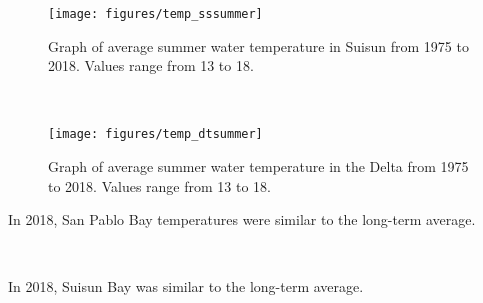 \documentclass[
]{book}
\begin{document}
\begin{panel-grid}
\begin{columns-nocenter}
\begin{column800}

\begin{expand}

\begin{figure}
\texttt{[image: figures/temp\_sssummer]} \caption{Graph of average summer water temperature in Suisun from 1975 to 2018. Values range from 13 to 18.}\label{fig:unnamed-chunk-58}
\end{figure}

\end{expand}

\end{column800}

\begin{column40}

~

\end{column40}

\begin{column800}

\begin{expand}

\begin{figure}
\texttt{[image: figures/temp\_dtsummer]} \caption{Graph of average summer water temperature in the Delta from 1975 to 2018. Values range from 13 to 18.}\label{fig:unnamed-chunk-59}
\end{figure}

\end{expand}

\end{column800}

\end{columns-nocenter}

\begin{columns-nocenter}

\begin{column800}

In 2018, San Pablo Bay temperatures were similar to the long-term average.

\end{column800}

\begin{column40}

~

\end{column40}

\begin{column800}

In 2018, Suisun Bay was similar to the long-term average.


\end{column800}
\end{columns-nocenter}
\end{panel-grid}
\end{document}
